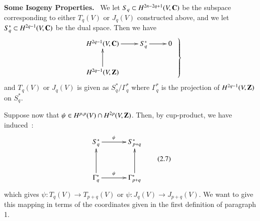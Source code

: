 \medskip
\noindent
{\bf Some Isogeny Properties.}~ We let $S_{q}\subset H^{2n-2q+1}(V,\mathbf{C})$ be the subspace corresponding to either $T_{q}(V)$ or $J_{q}(V)$ constructed above, and we let $S^{*}_{q}\subset H^{2q-1}(V,\mathbf{C})$ be the dual space. Then we have 
\[
\left.
\begin{array}{c}
\xymatrix{
H^{2q-1}(V,\bfC)\ar[r] & S^{*}_{q}\ar[r] & 0\\
H^{2q-1}(V,\bfZ)\ar[u] & &}
\end{array}\right\}
\]\pageoriginale
and $T_{q}(V)$ or $J_{q}(V)$ is given as $S^{*}_{q}/\Gamma^{*}_{q}$ where $\Gamma^{*}_{q}$ is the projection of $H^{2q-1}(V,\mathbf{Z})$ on $S^{*}_{q}$.

Suppose now that $\psi\in H^{p,p}(V)\cap H^{2p}(V,\mathbf{Z})$. Then, by cup-product, we have induced~:
\begin{equation*}
\vcenter{
\xymatrix@=1.2cm{
S^{*}_{q}\ar[r]^-{\psi} & S^{*}_{p+q}\\
\Gamma^{*}_{q}\ar[r]^-{\psi}\ar[u] & \Gamma^{*}_{p+q}\ar[u]
}}\tag{2.7}\label{art08-sec2-eq2.7}
\end{equation*}
which gives $\psi:T_{q}(V)\to T_{p+q}(V)$ or $\psi:J_{q}(V)\to J_{p+q}(V)$. We want to give this mapping in terms of the coordinates given in the first definition of paragraph 1.


